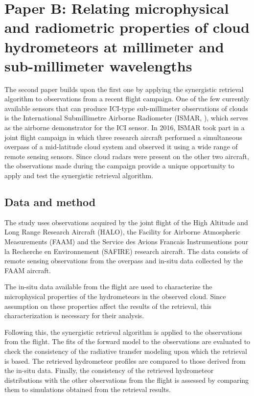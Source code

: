 \section{Paper B: Relating microphysical and radiometric properties of cloud
hydrometeors at millimeter and sub-millimeter wavelengths}

The second paper builds upon the first one by applying the synergistic retrieval
algorithm to observations from a recent flight campaign. One of the few
currently available sensors that can produce ICI-type sub-millimeter
observations of clouds is the International Submillimetre Airborne Radiometer
(ISMAR, \textcite{fox17}), which serves as the airborne demonstrator for the ICI
sensor. In 2016, ISMAR took part in a joint flight campaign in which three
research aircraft performed a simultaneous overpass of a mid-latitude cloud
system and observed it using a wide range of remote sensing sensors. Since cloud
radars were present on the other two aircraft, the observations made during the
campaign provide a unique opportunity to apply and test the synergistic
retrieval algorithm.

\subsection{Data and method}

The study uses observations acquired by the joint flight of the High Altitude
and Long Range Research Aircraft (HALO), the Facility for Airborne Atmospheric
Measurements (FAAM) and the Service des Avions Francais Instrumentions pour la
Recherche en Environnement (SAFIRE) research aircraft. The data consists of
remote sensing observations from the overpass and in-situ data collected by the
FAAM aircraft.

The in-situ data available from the flight are used to characterize the
microphysical properties of the hydrometeors in the observed cloud. Since
assumption on these properties affect the results of the retrieval, this
characterization is necessary for their analysis.

Following this, the synergistic retrieval algorithm is applied to the
observations from the flight. The fits of the forward model to the observations
are evaluated to check the consistency of the radiative transfer modeling upon
which the retrieval is based. The retrieved hydrometeor profiles are compared to
those derived from the in-situ data. Finally, the consistency of the retrieved
hydrometeor distributions with the other observations from the flight is assessed
by comparing them to simulations obtained from the retrieval results.

